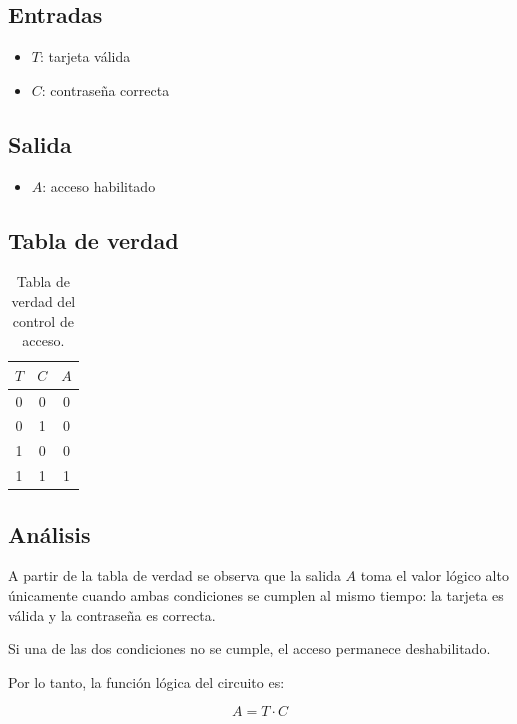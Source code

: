 \documentclass[a4paper,12pt]{article}
\begin{document}
\subsection{Entradas}

\begin{itemize}
	\item $T$: tarjeta válida
	\item $C$: contraseña correcta
\end{itemize}

\subsection{Salida}

\begin{itemize}
	\item $A$: acceso habilitado
\end{itemize}

\subsection{Tabla de verdad}

\begin{table}[h]
	\centering
	\begin{tabular}{|c|c|c|}
		\hline
		$T$ & $C$ & $A$ \\ \hline
		0 & 0 & 0 \\ \hline
		0 & 1 & 0 \\ \hline
		1 & 0 & 0 \\ \hline
		1 & 1 & 1 \\ \hline
	\end{tabular}
	\caption{Tabla de verdad del control de acceso.}
	\label{tab:ej5_acceso}
\end{table}

\subsection{Análisis}

A partir de la tabla de verdad se observa que la salida $A$ toma el valor lógico alto únicamente cuando ambas condiciones se cumplen al mismo tiempo: la tarjeta es válida y la contraseña es correcta.

Si una de las dos condiciones no se cumple, el acceso permanece deshabilitado.

Por lo tanto, la función lógica del circuito es:

\[
A = T \cdot C
\]
\end{document}
